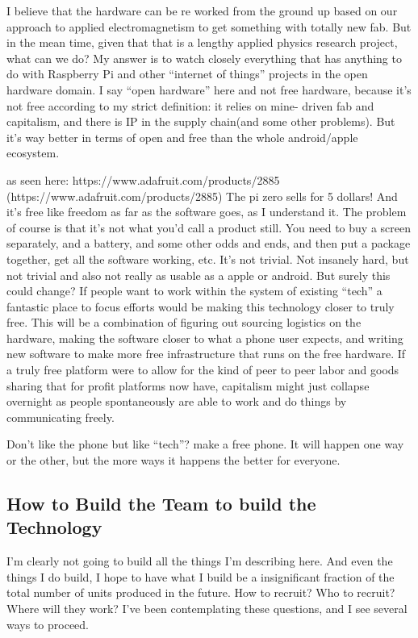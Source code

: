 I believe that the hardware can be re worked from the ground up based on
our approach to applied electromagnetism to get something with totally
new fab. But in the mean time, given that that is a lengthy applied
physics research project, what can we do? My answer is to watch closely
everything that has anything to do with Raspberry Pi and other
``internet of things'' projects in the open hardware domain. I say
``open hardware'' here and not free hardware, because it's not free
according to my strict definition: it relies on mine- driven fab and
capitalism, and there is IP in the supply chain(and some other
problems). But it's way better in terms of open and free than the whole
android/apple ecosystem.

as seen here: https://www.adafruit.com/products/2885
(https://www.adafruit.com/products/2885) The pi zero sells for 5
dollars! And it's free like freedom as far as the software goes, as I
understand it. The problem of course is that it's not what you'd call a
product still. You need to buy a screen separately, and a battery, and
some other odds and ends, and then put a package together, get all the
software working, etc. It's not trivial. Not insanely hard, but not
trivial and also not really as usable as a apple or android. But surely
this could change? If people want to work within the system of existing
``tech'' a fantastic place to focus efforts would be making this
technology closer to truly free. This will be a combination of figuring
out sourcing logistics on the hardware, making the software closer to
what a phone user expects, and writing new software to make more free
infrastructure that runs on the free hardware. If a truly free platform
were to allow for the kind of peer to peer labor and goods sharing that
for profit platforms now have, capitalism might just collapse overnight
as people spontaneously are able to work and do things by communicating
freely.

Don't like the phone but like ``tech''? make a free phone. It will
happen one way or the other, but the more ways it happens the better for
everyone.

\subsection{How to Build the Team to build the
Technology}\label{how-to-build-the-team-to-build-the-technology}

I'm clearly not going to build all the things I'm describing here. And
even the things I do build, I hope to have what I build be a
insignificant fraction of the total number of units produced in the
future. How to recruit? Who to recruit? Where will they work? I've been
contemplating these questions, and I see several ways to proceed.

